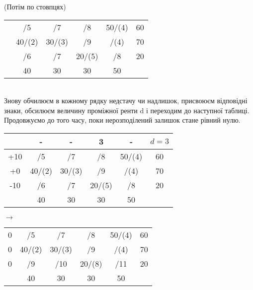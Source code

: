 \documentclass[12pt,a4paper]{book}
\begin{document}
(Потім по стовпцях)
\begin{tabular}{ | c | c | c | c | c | c | }
\hline
	&		&		&		&		&\\
\hline
	&	/5	&	/7	&	/8	&	50/(4)	&	60\\
\hline
	&	40/(2)	&	30/(3)	&	/9	&	/(4)	&	70\\
\hline
	&	/6	&	/7	&	20/(5)	&	/8	&	20\\
\hline
	&	40	&	30	&	30	&	50	&\\
\hline
\end{tabular}\\
Знову обчилюєм в кожному рядку недстачу чи надлишок, присвоюєм відповідні знаки, обсилюєм величину проміжної ренти d і переходим до наступної таблиці. Продовжуємо до того часу, поки нерозподілений залишок стане рівний нулю.\\
\begin{tabular}{ | c | c | c | c | c | c | }
\hline
	&	-	&	-	&	3	&	-	&	$d=3$\\
\hline
+10	&	/5	&	/7	&	/8	&	50/(4)	&	60\\
\hline
+0	&	40/(2)	&	30/(3)	&	/9	&	/(4)	&	70\\
\hline
-10	&	/6	&	/7	&	20/(5)	&	/8	&	20\\
\hline
	&	40	&	30	&	30	&	50	&\\
\hline
\end{tabular}
$\rightarrow$
\begin{tabular}{ | c | c | c | c | c | c | }
\hline
	&		&		&		&		&\\
\hline
0	&	/5	&	/7	&	/8	&	50/(4)	&	60\\
\hline
0	&	40/(2)	&	30/(3)	&	/9	&	/(4)	&	70\\
\hline
0	&	/9	&	/10	&	20/(8)	&	/11	&	20\\
\hline
	&	40	&	30	&	30	&	50	&\\
\hline
\end{tabular}\\
\end{document}
